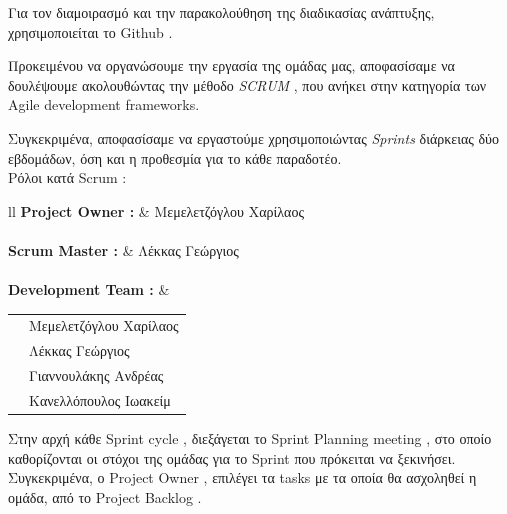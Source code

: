 \documentclass{../ol-softwaremanual}
\begin{document}
	
	Για τον διαμοιρασμό και την παρακολούθηση της διαδικασίας ανάπτυξης, χρησιμοποιείται το \en Github \gr.
	
	
	
	\newpage
	
	\flushleft
	Προκειμένου να οργανώσουμε την εργασία της ομάδας μας, αποφασίσαμε να δουλέψουμε ακολουθώντας την μέθοδο \en \textit{SCRUM} \gr , που ανήκει στην κατηγορία των \en Agile development frameworks. \gr
	
	Συγκεκριμένα, αποφασίσαμε να εργαστούμε χρησιμοποιώντας \en \textit{Sprints} \gr διάρκειας δύο εβδομάδων, όση και η προθεσμία για το κάθε παραδοτέο. \\ 
	
	Ρόλοι κατά \en Scrum \gr : \newline
	
	
	\flushleft
	\begin{tabular}{ll}
		\en \textbf{Project Owner : }  & \gr \hspace{5mm}  Μεμελετζόγλου Χαρίλαος \\
		\\ \en \textbf{Scrum Master : } &  \gr \hspace{5mm} Λέκκας Γεώργιος \\
		
		\\ \en \textbf{Development Team : } & \begin{tabular}[t]{ll}
			&  \gr  Μεμελετζόγλου Χαρίλαος  \\
			& \gr     Λέκκας Γεώργιος \\
			& \gr     Γιαννουλάκης Ανδρέας \\
			& \gr     Κανελλόπουλος Ιωακείμ \\
		\end{tabular} 
	\end{tabular} \linebreak
	
	\vspace{20pt}
	
	Στην αρχή κάθε \en Sprint cycle \gr , διεξάγεται το \en Sprint Planning meeting \gr , στο οποίο καθορίζονται οι στόχοι της ομάδας για το \en Sprint \gr που πρόκειται να ξεκινήσει. Συγκεκριμένα, ο \en Project Owner \gr , επιλέγει τα \en tasks \gr με τα οποία θα ασχοληθεί η ομάδα, από το \en Project Backlog \gr . \\
	
	\vspace{5pt}
	
\end{document}
